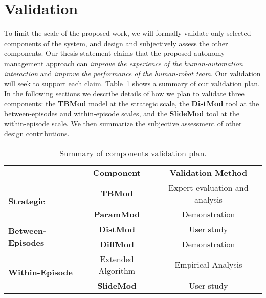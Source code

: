 \section{Validation}
\label{validation}

To limit the scale of the proposed work, we will formally validate only selected components of the system, and design and subjectively assess the other components. Our thesis statement claims that the proposed autonomy management approach can \textit{improve the experience of the human-automation interaction} and \textit{improve the performance of the human-robot team}. Our validation will seek to support each claim. Table~\ref{ValidateComponents} shows a summary of our validation plan. In the following sections we describe details of how we plan to validate three components: the \textbf{TBMod} model at the strategic scale, the \textbf{DistMod} tool at the between-episodes and within-episode scales, and the \textbf{SlideMod} tool at the within-episode scale. We then summarize the subjective assessment of other design contributions.

\begin{table}
	\begin{center}
		\begin{tabular}{|l|c|c|}
			\hline
				& \multirow{2}{*}{\textbf{Component}} & \multirow{2}{*}{\textbf{Validation Method}}  \\
				& & \\
			\hline
				\multirow{2}{*}{\textbf{Strategic}} & \textbf{TBMod} & Expert evaluation and analysis \\ \cline{2-3}
				& \textbf{ParamMod} & Demonstration \\
			\hline
				\multirow{2}{*}{\textbf{Between-Episodes}} & \textbf{DistMod} & User study \\ \cline{2-3}
				& \textbf{DiffMod} & Demonstration \\
			\hline
				\multirow{2}{*}{\textbf{Within-Episode}} & Extended Algorithm & Empirical Analysis \\ \cline{2-3}
				& \textbf{SlideMod} & User study \\
			\hline
		\end{tabular}
	\end{center}
\caption{Summary of components validation plan.}	
\label{ValidateComponents}
\end{table}

